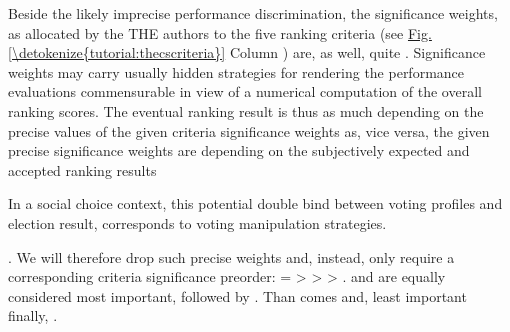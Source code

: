 \documentclass[a4paper,12pt,english]{sphinxhowto}
\begin{document}
Beside the likely imprecise performance discrimination, the  significance weights, as allocated by the THE authors to the five ranking criteria (see \hyperref[\detokenize{tutorial:thecscriteria}]{Fig.\@ \ref{\detokenize{tutorial:thecscriteria}}} Column ) are, as well, quite . Significance weights may carry usually hidden strategies for rendering the performance evaluations commensurable in view of a numerical computation of the overall ranking scores. The eventual ranking result is thus as much depending on the precise values of the given criteria significance weights as, vice versa, the given precise significance weights are depending on the subjectively expected and accepted ranking results %
\begin{footnote}[42]\sphinxAtStartFootnote
In a social choice context, this potential double bind between voting profiles and election result, corresponds to voting manipulation strategies.
%
\end{footnote}. We will therefore drop such precise weights and, instead, only require a corresponding criteria significance preorder:  =  \textgreater{}  \textgreater{}  \textgreater{} .  and  are equally considered most important, followed by . Than comes  and, least important finally, .
\end{document}
